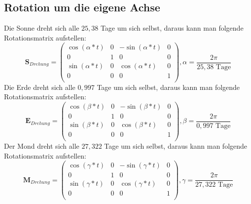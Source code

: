 \documentclass[a4paper,11pt,DIV11]{scrartcl}
\begin{document}
\subsection{Rotation um die eigene Achse}
Die Sonne dreht sich alle $25,38$ Tage um sich selbst, daraus kann man folgende Rotationsmatrix aufstellen:
\begin{equation}
\bm{S}_{Drehung} = 
\begin{pmatrix}
\cos(\alpha * t) & 0 &-\sin(\alpha * t) & 0 \\
0 & 1 & 0 & 0 \\
\sin(\alpha * t) & 0 & \cos(\alpha * t) & 0 \\
0 & 0 & 0 & 1 \\
\end{pmatrix}
, \alpha = \frac{2 \pi}{25,38 \text{ Tage}}
\end{equation}
Die Erde dreht sich alle $0,997$ Tage um sich selbst, daraus kann man folgende Rotationsmatrix aufstellen:
\begin{equation}
\bm{E}_{Drehung} = 
\begin{pmatrix}
\cos(\beta * t) & 0 &-\sin(\beta * t) & 0 \\
0 & 1 & 0 & 0 \\
\sin(\beta * t) & 0 & \cos(\beta * t) & 0 \\
0 & 0 & 0 & 1 \\
\end{pmatrix}
, \beta = \frac{2 \pi}{0,997 \text{ Tage}}
\end{equation}
Der Mond dreht sich alle $27,322$ Tage um sich selbst, daraus kann man folgende Rotationsmatrix aufstellen:
\begin{equation}
\bm{M}_{Drehung} = 
\begin{pmatrix}
\cos(\gamma * t) & 0 &-\sin(\gamma * t) & 0 \\
0 & 1 & 0 & 0 \\
\sin(\gamma * t) & 0 & \cos(\gamma * t) & 0 \\
0 & 0 & 0 & 1 \\
\end{pmatrix}
, \gamma = \frac{2 \pi}{27,322 \text{ Tage}}
\end{equation}
\end{document}
